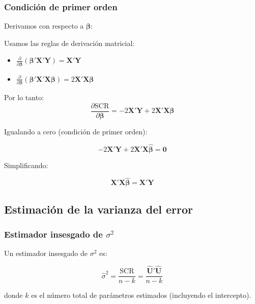 \documentclass[11pt,a4paper]{article}
\newenvironment{demostración}[1][]{%
\begin{tcolorbox}[
ccdebox,
colback=white,
colframe=ccdeaccent,
title={Demostración\ifstrempty{#1}{}{ -- #1}},
boxed title style={colback=ccdeaccent}
]
}{\end{tcolorbox}}
\begin{document}
\subsubsection*{Condición de primer orden}
 
Derivamos con respecto a $\boldsymbol{\beta}$:
 
\begin{demostración}[Derivada vectorial]
 
Usamos las reglas de derivación matricial:
\begin{itemize}[noitemsep]
    \item $\frac{\partial}{\partial \boldsymbol{\beta}}(\boldsymbol{\beta}'\mathbf{X}'\mathbf{Y}) = \mathbf{X}'\mathbf{Y}$
    \item $\frac{\partial}{\partial \boldsymbol{\beta}}(\boldsymbol{\beta}'\mathbf{X}'\mathbf{X}\boldsymbol{\beta}) = 2\mathbf{X}'\mathbf{X}\boldsymbol{\beta}$
\end{itemize}
 
Por lo tanto:
\[
\frac{\partial \text{SCR}}{\partial \boldsymbol{\beta}} = -2\mathbf{X}'\mathbf{Y} + 2\mathbf{X}'\mathbf{X}\boldsymbol{\beta}
\]
 
\end{demostración}
 
Igualando a cero (condición de primer orden):
 
\[
-2\mathbf{X}'\mathbf{Y} + 2\mathbf{X}'\mathbf{X}\hat{\boldsymbol{\beta}} = \mathbf{0}
\]
 
Simplificando:
 
\[
\mathbf{X}'\mathbf{X}\hat{\boldsymbol{\beta}} = \mathbf{X}'\mathbf{Y}
\]

 
\subsection{Estimación de la varianza del error}
 
\subsubsection*{Estimador insesgado de \(\sigma^2\)}
 
\begin{teorema}
 
Un estimador insesgado de $\sigma^2$ es:
 
\begin{resultado}
\[
\boxed{\hat{\sigma}^2 = \frac{\text{SCR}}{n-k} = \frac{\hat{\mathbf{U}}'\hat{\mathbf{U}}}{n-k}}
\]
 
donde $k$ es el número total de parámetros estimados (incluyendo el intercepto).
\end{resultado}
 
\end{teorema}
 
\end{document}
